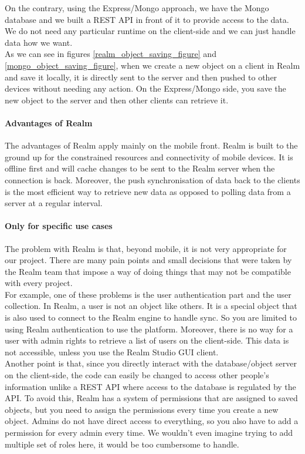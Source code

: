 \documentclass[11pt,a4paper]{report}
\begin{document}
On the contrary, using the Express/Mongo approach, we have the Mongo database and we built a REST API in front of it to provide access to the data. We do not need any particular runtime on the client-side and we can just handle data how we want. \\

As we can see in figures \ref{realm_object_saving_figure} and \ref{mongo_object_saving_figure}, when we create a new object on a client in Realm and save it locally, it is directly sent to the server and then pushed to other devices without needing any action. On the Express/Mongo side, you save the new object to the server and then other clients can retrieve it. \\
\paragraph{Advantages of Realm}
The advantages of Realm apply mainly on the mobile front. Realm is built to the ground up for the constrained resources and connectivity of mobile devices. It is offline first and will cache changes to be sent to the Realm server when the connection is back. Moreover, the push synchronisation of data back to the clients is the most efficient way to retrieve new data as opposed to polling data from a server at a regular interval.
\paragraph{Only for specific use cases}
The problem with Realm is that, beyond mobile, it is not very appropriate for our project. There are many pain points and small decisions that were taken by the Realm team that impose a way of doing things that may not be compatible with every project.\\

For example, one of these problems is the user authentication part and the user collection. In Realm, a user is not an object like others. It is a special object that is also used to connect to the Realm engine to handle sync. So you are limited to using Realm authentication to use the platform. Moreover, there is no way for a user with admin rights to retrieve a list of users on the client-side. This data is not accessible, unless you use the Realm Studio GUI client.\\

Another point is that, since you directly interact with the database/object server on the client-side, the code can easily be changed to access other people's information unlike a REST API where access to the database is regulated by the API. To avoid this, Realm has a system of permissions that are assigned to saved objects, but you need to assign the permissions every time you create a new object. Admins do not have direct access to everything, so you also have to add a permission for every admin every time. We wouldn't even imagine trying to add multiple set of roles here, it would be too cumbersome to handle.\\
\end{document}
